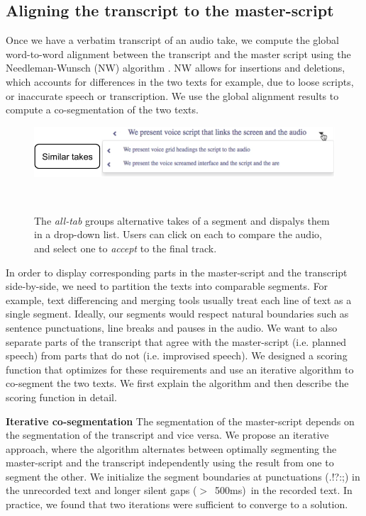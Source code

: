 \subsection{Aligning the transcript to the master-script}
Once we have a verbatim transcript of an audio take, we compute the global word-to-word alignment between the transcript and the master script using the Needleman-Wunsch (NW) algorithm \cite{needleman1970general}. NW allows for insertions and deletions, which accounts for differences in the two texts for example, due to loose scripts, or inaccurate speech or transcription. We use the global alignment results to compute a co-segmentation of the two texts.
\begin{figure}
\centering
  \includegraphics[width=1.0\columnwidth]{figures/multipletakes}
  \caption{The \textit{all-tab} groups alternative takes of a segment and dispalys them in a drop-down list. Users can click on each to compare the audio, and select one to \textit{accept} to the final track.  }~\label{fig:multipletakes}
\end{figure}
In order to display corresponding parts in the master-script and the transcript side-by-side, we need to partition the texts into comparable segments. For example, text differencing and merging tools usually treat each line of text as a single segment.
Ideally, our segments would respect natural boundaries such as sentence punctuations, line breaks and pauses in the audio. We want to also separate parts of the transcript that agree with the master-script (i.e. planned speech) from parts that do not (i.e. improvised speech).  
We designed a scoring function that optimizes for these requirements and use an iterative algorithm to co-segment the two texts. We first explain the algorithm and then describe the scoring function in detail.

\textbf{Iterative co-segmentation}
The segmentation of the master-script depends on the segmentation of the transcript and vice versa. We propose an iterative approach, where the algorithm alternates between optimally segmenting the master-script and the transcript independently using the result from one to segment the other. We initialize the segment boundaries at punctuations (.!?:;) in the unrecorded text and longer silent gaps ($>$\ 500ms)\ in the recorded text. In practice, we
found that two iterations were sufficient to converge to a solution.


